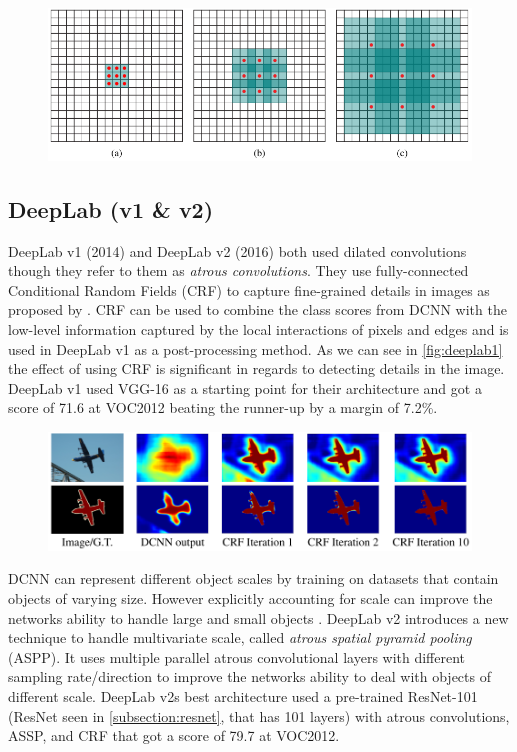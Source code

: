 \begin{figure}[H]
    \centering
    \includegraphics[width=0.7\linewidth]{fig/dilution.png}
    \label{fig:dilution}
\end{figure}


\subsection{DeepLab (v1 \& v2)}
DeepLab v1 (2014) \cite{Chen2014} and DeepLab v2 (2016) \cite{Chen2016} both used dilated convolutions though they refer to them as \emph{atrous convolutions}. They use fully-connected Conditional Random Fields (CRF) to capture fine-grained details in images as proposed by \citet{Krahenbuhl2012a}. CRF can be used to combine the class scores from DCNN with the low-level information captured by the local interactions of pixels and edges \cite{Chen2014} and is used in DeepLab v1 as a post-processing method. As we can see in \autoref{fig:deeplab1} the effect of using CRF is significant in regards to detecting details in the image. DeepLab v1 used VGG-16 as a starting point for their architecture and got a score of 71.6 at VOC2012 beating the runner-up by a margin of 7.2\%. 

\begin{figure}[H]
    \centering
    \includegraphics[width=0.7\linewidth]{fig/deeplab1.png}
    \label{fig:deeplab1}
\end{figure}


DCNN can represent different object scales by training on datasets that contain objects of varying size. However explicitly accounting for scale can improve the networks ability to handle large and small objects \cite{Papandreou2015}. DeepLab v2 introduces a new technique to handle multivariate scale, called \emph{atrous spatial pyramid pooling} (ASPP). It uses multiple parallel atrous convolutional layers with different sampling rate/direction to improve the networks ability to deal with objects of different scale. DeepLab v2s best architecture used a pre-trained ResNet-101 (ResNet seen in \autoref{subsection:resnet}, that has 101 layers) with atrous convolutions, ASSP, and CRF that got a score of 79.7 at VOC2012.


